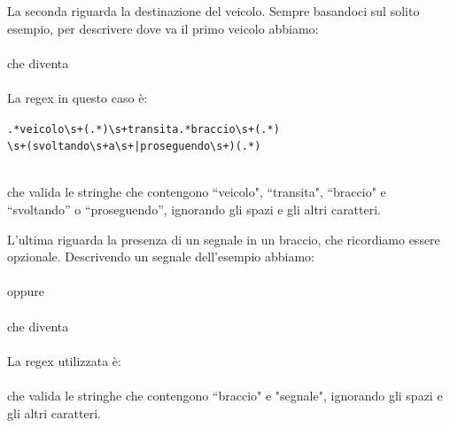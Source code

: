 La seconda riguarda la destinazione del veicolo. Sempre basandoci sul solito esempio, per descrivere dove va il primo veicolo abbiamo:
\vspace{1mm} \\
\vspace{1mm}
\indent {} \\
che diventa \\
\vspace{1mm}
\indent {} \\
\vspace{1mm}
\noindent La regex in questo caso è: \\ 
\vspace{1mm}
\indent\indent\indent
\begin{varwidth}{7cm}
	\begin{mdframed}
		\texttt{.*veicolo\textbackslash s+(.*)\textbackslash s+transita.*braccio\textbackslash  s+(.*)} \\
		\texttt{\textbackslash s+(svoltando\textbackslash s+a\textbackslash s+|proseguendo\textbackslash s+)(.*)}		
	\end{mdframed}
\end{varwidth} \\
\vspace{1mm}
che valida le stringhe che contengono ``veicolo", ``transita", ``braccio" e ``svoltando'' o ``proseguendo'', ignorando gli spazi e gli altri caratteri.

L'ultima riguarda la presenza di un segnale in un braccio, che ricordiamo essere opzionale. Descrivendo un segnale dell'esempio abbiamo: 
\vspace{1mm}\\
\vspace{1mm}
\indent {} \\
oppure \\
\vspace{1mm}
\indent {} \\
\vspace{1mm}
che diventa \\
\vspace{1mm}
\indent {} \\
\vspace{1mm}
\noindent La regex utilizzata è: \\
\vspace{1mm}
\indent {} \\ \noindent che valida le stringhe che contengono ``braccio" e "segnale", ignorando gli spazi e gli altri caratteri.

